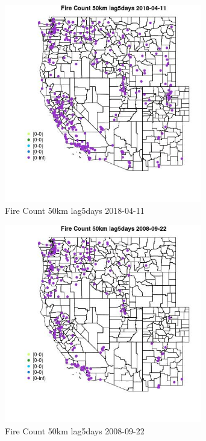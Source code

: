 \begin{figure} 
\centering  
\includegraphics[width=0.77\textwidth]{Code_Outputs/Report_ML_input_PM25_Step4_part_e_de_duplicated_aves_compiled_2019-05-18wNAs_MapObsFire_Count_50km_lag5days2018-04-11.jpg} 
\caption{\label{fig:Report_ML_input_PM25_Step4_part_e_de_duplicated_aves_compiled_2019-05-18wNAsMapObsFire_Count_50km_lag5days2018-04-11}Fire Count 50km lag5days 2018-04-11} 
\end{figure} 
 

\begin{figure} 
\centering  
\includegraphics[width=0.77\textwidth]{Code_Outputs/Report_ML_input_PM25_Step4_part_e_de_duplicated_aves_compiled_2019-05-18wNAs_MapObsFire_Count_50km_lag5days2008-09-22.jpg} 
\caption{\label{fig:Report_ML_input_PM25_Step4_part_e_de_duplicated_aves_compiled_2019-05-18wNAsMapObsFire_Count_50km_lag5days2008-09-22}Fire Count 50km lag5days 2008-09-22} 
\end{figure} 
 

